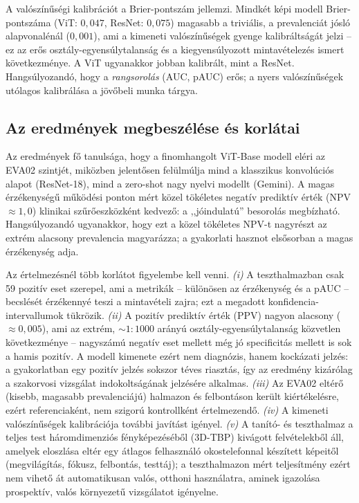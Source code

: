 A valószínűségi kalibrációt a Brier-pontszám jellemzi. Mindkét képi modell
Brier-pontszáma (ViT: $0{,}047$, ResNet: $0{,}075$) magasabb a triviális, a
prevalenciát jósló alapvonalénál ($0{,}001$), ami a kimeneti valószínűségek
gyenge kalibráltságát jelzi -- ez az erős osztály-egyensúlytalanság és a
kiegyensúlyozott mintavételezés ismert következménye. A ViT ugyanakkor jobban
kalibrált, mint a ResNet. Hangsúlyozandó, hogy a \textit{rangsorolás} (AUC, pAUC)
erős; a nyers valószínűségek utólagos kalibrálása a jövőbeli munka tárgya.

\subsection{Az eredmények megbeszélése és korlátai}

Az eredmények fő tanulsága, hogy a finomhangolt ViT-Base modell eléri az EVA02
szintjét, miközben jelentősen felülmúlja
mind a klasszikus konvolúciós alapot (ResNet-18), mind a zero-shot nagy nyelvi
modellt (Gemini). A magas érzékenységű működési ponton mért közel tökéletes
negatív prediktív érték (NPV $\approx 1{,}0$) klinikai szűrőeszközként kedvező: a
,,jó\-indulatú'' besorolás megbízható. Hangsúlyozandó ugyanakkor, hogy ezt a közel
tökéletes NPV-t nagyrészt az extrém alacsony prevalencia magyarázza; a gyakorlati
hasznot elsősorban a magas érzékenység adja.

Az értelmezésnél több korlátot figyelembe kell venni. \emph{(i)} A teszthalmazban
csak 59 pozitív eset szerepel, ami a metrikák -- különösen az érzékenység és a
pAUC -- becslését érzékennyé teszi a mintavételi zajra; ezt a megadott
konfidencia-intervallumok tükrözik. \emph{(ii)} A pozitív prediktív érték (PPV)
nagyon alacsony ($\approx 0{,}005$), ami az extrém, $\sim 1{:}1000$ arányú
osztály-egyensúlytalanság közvetlen következménye -- nagyszámú negatív eset
mellett még jó specificitás mellett is sok a hamis pozitív. A modell kimenete
ezért nem diagnózis, hanem kockázati jelzés: a gyakorlatban egy pozitív jelzés
sokszor téves riasztás, így az eredmény kizárólag a szakorvosi vizsgálat
indokoltságának jelzésére alkalmas. \emph{(iii)} Az EVA02
eltérő (kisebb, magasabb prevalenciájú) halmazon és felbontáson került
kiértékelésre, ezért referenciaként, nem szigorú kontrollként értelmezendő.
\emph{(iv)} A kimeneti valószínűségek kalibrációja további javítást igényel.
\emph{(v)} A tanító- és teszthalmaz a teljes test háromdimenziós fényképezéséből
(3D-TBP) kivágott felvételekből áll, amelyek eloszlása eltér egy átlagos
felhasználó okostelefonnal készített képeitől (megvilágítás, fókusz, felbontás,
testtáj); a teszthalmazon mért teljesítmény ezért nem vihető át automatikusan
valós, otthoni használatra, aminek igazolása prospektív, valós környezetű
vizsgálatot igényelne.
